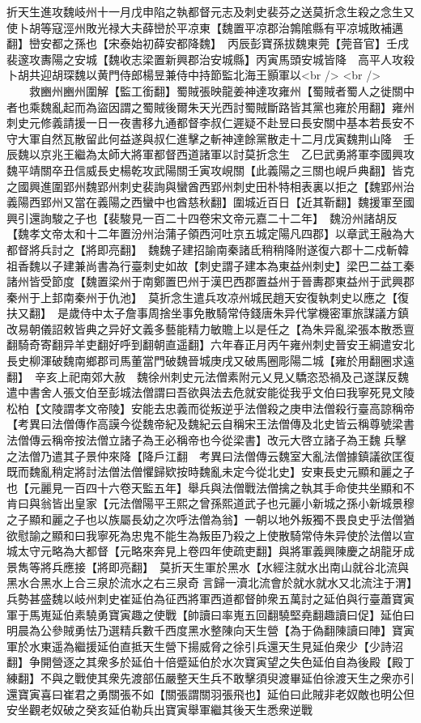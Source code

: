 折天生進攻魏岐州十一月戊申陷之執都督元志及刺史裴芬之送莫折念生殺之念生又使卜胡等寇涇州敗光禄大夫薛巒於平凉東【魏置平凉郡治鶉隂縣有平凉城敗補邁翻】巒安都之孫也【宋泰始初薛安都降魏】　丙辰彭寶孫拔魏東莞【莞音官】壬戌裴邃攻夀陽之安城【魏收志梁置新興郡治安城縣】丙寅馬頭安城皆降　高平人攻殺卜胡共迎胡琛魏以黄門侍郎楊昱兼侍中持節監北海王顥軍以<br />
<br />
　　救豳州豳州圍解【監工銜翻】蜀賊張映龍姜神達攻雍州【蜀賊者蜀人之徙關中者也乘魏亂起而為盜因謂之蜀賊後爾朱天光西討蜀賊斷路皆其黨也雍於用翻】雍州刺史元修義請援一日一夜書移九通都督李叔仁遲疑不赴昱曰長安關中基本若長安不守大軍自然瓦散留此何益遂與叔仁進擊之斬神達餘黨散走十二月戊寅魏荆山降　壬辰魏以京兆王繼為太師大將軍都督西道諸軍以討莫折念生　乙巳武勇將軍李國興攻魏平靖關卒丑信威長史楊乾攻武陽關壬寅攻峴關【此義陽之三關也峴戶典翻】皆克之國興進圍郢州魏郢州刺史裴詢與蠻酋西郢州刺史田朴特相表裏以拒之【魏郢州治義陽西郢州又當在義陽之西蠻中也酋慈秋翻】圍城近百日【近其靳翻】魏援軍至國興引還詢駿之子也【裴駿見一百二十四卷宋文帝元嘉二十二年】　魏汾州諸胡反【魏孝文帝太和十二年置汾州治蒲子領西河吐京五城定陽凡四郡】以章武王融為大都督將兵討之【將即亮翻】　魏魏子建招諭南秦諸氐稍稍降附遂復六郡十二戍斬韓祖香魏以子建兼尚書為行臺刺史如故【刺史謂子建本為東益州刺史】梁巴二益工秦諸州皆受節度【魏置梁州于南鄭置巴州于漢巴西郡置益州于晉夀郡東益州于武興郡秦州于上邽南秦州于仇池】　莫折念生遣兵攻凉州城民趙天安復執刺史以應之【復扶又翻】　是歲侍中太子詹事周捨坐事免散騎常侍錢唐朱异代掌機密軍旅謀議方鎮改易朝儀詔敕皆典之异好文義多藝能精力敏贍上以是任之【為朱异亂梁張本散悉亶翻騎奇寄翻异羊吏翻好呼到翻朝直遥翻】六年春正月丙午雍州刺史晉安王綱遣安北長史柳渾破魏南鄉郡司馬董當門破魏晉城庚戌又破馬圈彫陽二城【雍於用翻圈求遠翻】　辛亥上祀南郊大赦　魏徐州刺史元法僧素附元乂見乂驕恣恐禍及己遂謀反魏遣中書舍人張文伯至彭城法僧謂曰吾欲與法去危就安能從我乎文伯曰我寧死見文陵松柏【文陵謂孝文帝陵】安能去忠義而從叛逆乎法僧殺之庚申法僧殺行臺高諒稱帝　【考異曰法僧傳作高謨今從魏帝紀及魏紀云自稱宋王法僧傳及北史皆云稱尊號梁書法僧傳云稱帝按法僧立諸子為王必稱帝也今從梁書】改元大啓立諸子為王魏兵擊之法僧乃遣其子景仲來降【降戶江翻　考異曰法僧傳云魏室大亂法僧據鎮議欲匡復既而魏亂稍定將討法僧法僧懼歸欵按時魏亂未定今從北史】安東長史元顯和麗之子也【元麗見一百四十六卷天監五年】舉兵與法僧戰法僧擒之執其手命使共坐顯和不肯曰與翁皆出皇家【元法僧陽平王熙之曾孫熙道武子也元麗小新城之孫小新城景穆之子顯和麗之子也以族屬長幼之次呼法僧為翁】一朝以地外叛獨不畏良史乎法僧猶欲慰諭之顯和曰我寧死為忠鬼不能生為叛臣乃殺之上使散騎常侍朱异使於法僧以宣城太守元略為大都督【元略來奔見上卷四年使疏吏翻】與將軍義興陳慶之胡龍牙成景雋等將兵應接【將即亮翻】　莫折天生軍於黑水【水經注就水出南山就谷北流與黑水合黑水上合三泉於流水之右三泉奇言歸一瀆北流會於就水就水又北流注于渭】兵勢甚盛魏以岐州刺史崔延伯為征西將軍西道都督帥衆五萬討之延伯與行臺蕭寶寅軍于馬嵬延伯素驍勇寶寅趣之使戰【帥讀曰率嵬五回翻驍堅堯翻趣讀曰促】延伯曰明晨為公參賊勇怯乃選精兵數千西度黑水整陳向天生營【為于偽翻陳讀曰陣】寶寅軍於水東遥為繼援延伯直抵天生營下揚威脅之徐引兵還天生見延伯衆少【少詩沼翻】争開營逐之其衆多於延伯十倍蹙延伯於水次寶寅望之失色延伯自為後殿【殿丁練翻】不與之戰使其衆先渡部伍嚴整天生兵不敢擊須臾渡畢延伯徐渡天生之衆亦引還寶寅喜曰崔君之勇關張不如【關張謂關羽張飛也】延伯曰此賊非老奴敵也明公但安坐觀老奴破之癸亥延伯勒兵出寶寅舉軍繼其後天生悉衆逆戰